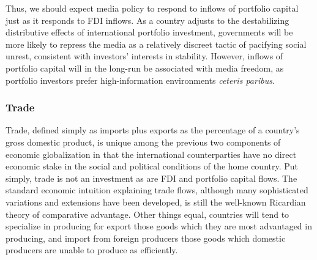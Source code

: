 \documentclass[12pt]{report}
\begin{document}
Thus, we should expect media policy to respond to inflows of portfolio capital just as it responds
to FDI inflows. As a country adjusts to the destabilizing distributive effects of international
portfolio investment, governments will be more likely to repress the media as a relatively discreet
tactic of pacifying social unrest, consistent with investors' interests in stability. However,
inflows of portfolio capital will in the long-run be associated with media freedom, as portfolio
investors prefer high-information environments \emph{ceteris paribus}.

\subsubsection{Trade}

Trade, defined simply as imports plus exports as the percentage of a country's gross domestic
product, is unique among the previous two components of economic globalization in that the
international counterparties have no direct economic stake in the social and political conditions of
the home country. Put simply, trade is not an investment as are FDI and portfolio capital flows. The
standard economic intuition explaining trade flows, although many sophisticated variations and
extensions have been developed, is still the well-known Ricardian theory of comparative advantage.
Other things equal, countries will tend to specialize in producing for export those goods which they
are most advantaged in producing, and import from foreign producers those goods which domestic
producers are unable to produce as efficiently.
\end{document}
